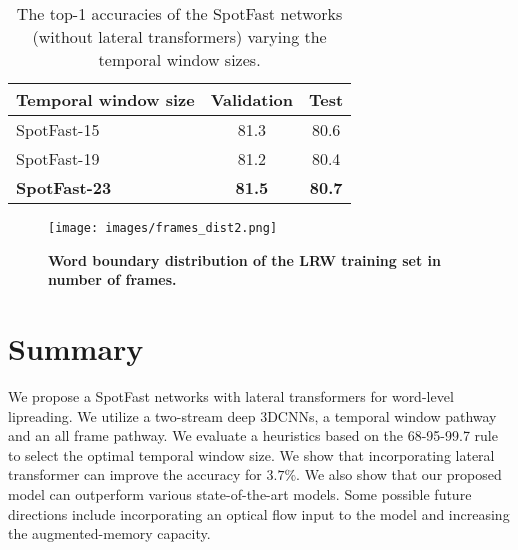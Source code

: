 \documentclass{article}
\begin{document}
\begin{table}[] \label{stable2}
\vspace{0.5\baselineskip}
\centering
\caption{The top-1 accuracies of the SpotFast networks (without lateral transformers) varying the temporal window sizes.}
\vspace{0.5\baselineskip}
\label{stable2}
\begin{tabular}{l|c|c}
\hline
 Temporal window size    & Validation & Test  \\
\hline
 SpotFast-15 & 81.3 & 80.6\\
\hline
SpotFast-19 & 81.2  & 80.4 \\ 
\hline
\textbf{SpotFast-23} &  \textbf{81.5} & \textbf{80.7}\\
\hline
\end{tabular}
\end{table}

\begin{figure}[t] \label{figstat}
\begin{center}
   \texttt{[image: images/frames\_dist2.png]}
\end{center}
\vspace{-1.5\baselineskip}
   \caption{\textbf{Word boundary distribution of the LRW training set in number of frames.}}
\label{fig:long}
\label{fig:onecol}
\vspace{-1\baselineskip}
\end{figure}







 \section{Summary}
We propose a SpotFast networks with lateral transformers for word-level lipreading. We utilize a two-stream deep 3DCNNs, a temporal window pathway and an all frame pathway. We evaluate a heuristics based on the 68-95-99.7 rule to select the optimal temporal window size. We show that incorporating lateral transformer can improve the accuracy for $3.7\%$. We also show that our proposed model can outperform various state-of-the-art models. Some possible future directions include incorporating an optical flow input to the model and increasing the augmented-memory capacity.
 


\end{document}
